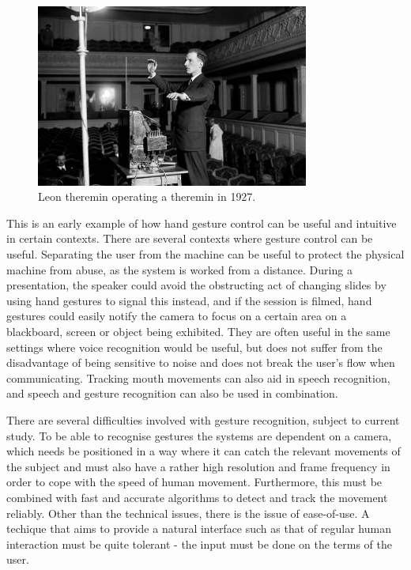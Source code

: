 \begin{figure}[]
\includegraphics[width=0.8\textwidth] {bilder/teremin.jpg}
\caption{Leon theremin operating a theremin in 1927.}
\label{theremin}
\end{figure}
\nocite{theremin}

This is an early example of how hand gesture control can be useful and intuitive in certain contexts. There are several contexts where gesture control can be useful. Separating the user from the machine can be useful to protect the physical machine from abuse, as the system is worked from a distance. During a presentation, the speaker could avoid the obstructing act of changing slides by using hand gestures to signal this instead, and if the session is filmed, hand gestures could easily notify the camera to focus on a certain area on a blackboard, screen or object being exhibited. They are often useful in the same settings where voice recognition would be useful, but does not suffer from the disadvantage of being sensitive to noise and does not break the user's flow when communicating\cite{Hardenberg01bare-handhuman-computer}. Tracking mouth movements can also aid in speech recognition, and speech and gesture recognition can also be used in combination\cite{conf/icmcs/LiuK10}\cite{conf/icmcs/SarginAKOYWEYT06}.

There are several difficulties involved with gesture recognition, subject to current study. To be able to recognise gestures the systems are dependent on a camera, which needs be positioned in a way where it can catch the relevant movements of the subject and must also have a rather high resolution and frame frequency in order to cope with the speed of human movement. Furthermore, this must be combined with fast and accurate algorithms to detect and track the movement reliably. Other than the technical issues, there is the issue of ease-of-use. A techique that aims to provide a natural interface such as that of regular human interaction must be quite tolerant - the input must be done on the terms of the user. 

